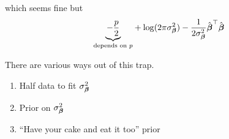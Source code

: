 \documentclass{amsart}
\begin{document}
which seems fine but
\[
	\underset{\text{depends on $p$}}{\underbrace{-\frac{p}{2}}} + \log (2 \pi \sigma^2_{\boldsymbol \beta}) - \frac{1}{2 \sigma_{\boldsymbol \beta}^2} \hat{{\boldsymbol \beta}}^\top \hat{{\boldsymbol \beta}}
\]

There are various ways out of this trap.

\begin{enumerate}
\item Half data to fit $\sigma^2_{\boldsymbol \beta}$
\item Prior on $\sigma^2_{\boldsymbol \beta}$
\item ``Have your cake and eat it too'' prior
\end{enumerate}
\end{document}
